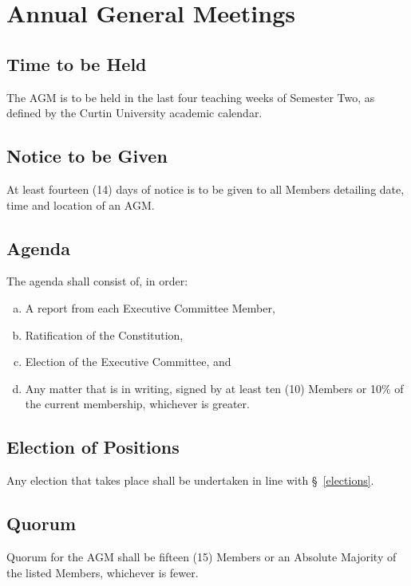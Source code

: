 \documentclass[a4paper,12pt]{article}
\begin{document}
\section{Annual General Meetings}

\subsection{Time to be Held}

The AGM is to be held in the last four teaching weeks of Semester Two, as defined by the Curtin University academic calendar.

\subsection{Notice to be Given}

At least fourteen (14) days of notice is to be given to all Members detailing date, time and location of an AGM.

\subsection{Agenda}

The agenda shall consist of, in order:

\begin{enumerate}[a)]
	\item A report from each Executive Committee Member,
	\item Ratification of the Constitution,
	\item Election of the Executive Committee, and
	\item Any matter that is in writing, signed by at least ten (10) Members or 10\% of the current membership, whichever is greater.
\end{enumerate}

\subsection{Election of Positions}

Any election that takes place shall be undertaken in line with \S~\ref{elections}.

\subsection{Quorum}

Quorum for the AGM shall be fifteen (15) Members or an Absolute Majority of the listed Members, whichever is fewer.
\end{document}
